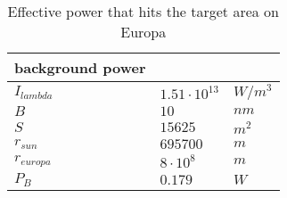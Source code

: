 \begin{table}[H]
\centering
\caption{Effective power that hits the target area on Europa}
\label{tab:power_background}
\begin{tabular}{|l|ll|} \hline
\textbf{background power} &                     &         \\ \hline
$I_{lambda}$              & $1.51\cdot10^{13}$  & $W/m^3$ \\
$B$                       & $10$                & $nm$    \\
$S$                       & $15625$             & $m^2$   \\
$r_{sun}$                 & $695700$            & $m$     \\
$r_{europa}$              & $8\cdot10^8$        & $m$     \\
$P_B$                     & $0.179$             & $W$     \\ \hline
\end{tabular}
\end{table}
